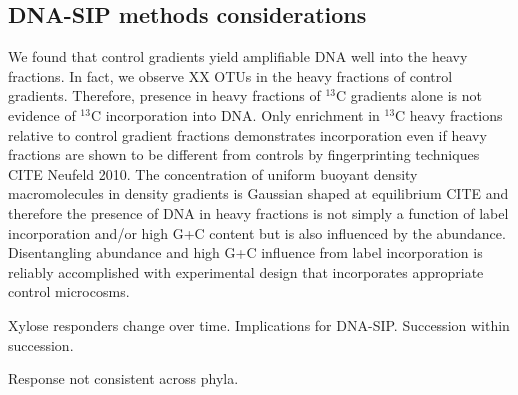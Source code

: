 \subsection{DNA-SIP methods considerations}
We found that control gradients yield amplifiable DNA well into the heavy
fractions. In fact, we observe XX OTUs in the heavy fractions of control
gradients. Therefore, presence in heavy fractions of $^{13}$C gradients alone
is not evidence of $^{13}$C incorporation into DNA. Only enrichment in
$^{13}$C heavy fractions relative to control gradient fractions demonstrates
incorporation even if heavy fractions are shown to be different from controls
by fingerprinting techniques CITE Neufeld 2010. The concentration of uniform
buoyant density macromolecules in density gradients is Gaussian shaped at
equilibrium CITE and therefore the presence of DNA in heavy fractions is not
simply a function of label incorporation and/or high G+C content but is also
influenced by the abundance. Disentangling abundance and high G+C influence
from label incorporation is reliably accomplished with experimental design that
incorporates appropriate control microcosms.

Xylose responders change over time. Implications for DNA-SIP. Succession within
succession.

Response not consistent across phyla.

